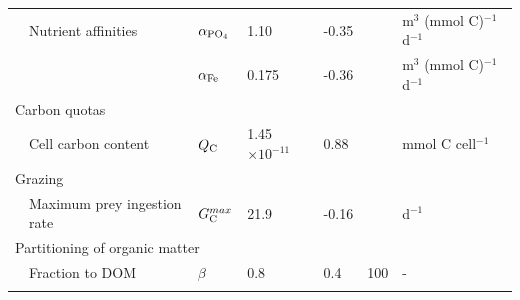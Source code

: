 \documentclass[gmd, manuscript]{copernicus}
\begin{document}
{\begin{table}[htp!]
\begin{tabular*}{1.0\textwidth}{@{\extracolsep{\fill}}lllllll}
&Nutrient affinities			 & $\alpha_{\rm PO_4}$ & 1.10 & -0.35 & & m$^{3}$ (mmol C)$^{-1}$ d$^{-1}$ \\ 
& & $\alpha_{\rm Fe}$ & 0.175 & -0.36 & & m$^{3}$ (mmol C)$^{-1}$ d$^{-1}$ \\ 
\multicolumn{7}{l}{{Carbon quotas}} \\ 
&Cell carbon content & $Q_{\rm C}$ & 1.45$\times10^{-11}$ & 0.88 & & mmol C cell$^{-1}$ \\ 
\multicolumn{7}{l}{{Grazing}}\\
&Maximum prey ingestion rate & $G^{max}_{\rm C}$ & 21.9 & -0.16 & & d$^{-1}$ \\ 
\multicolumn{5}{l}{{Partitioning of organic matter}}\\ 
& Fraction to DOM & $\beta$ & 0.8 & 0.4 & 100 & - \\ 
\hline\\ [-1ex]
\end{tabular*}
\label{Size_dependent}
\end{table}


%


}
\end{document}
